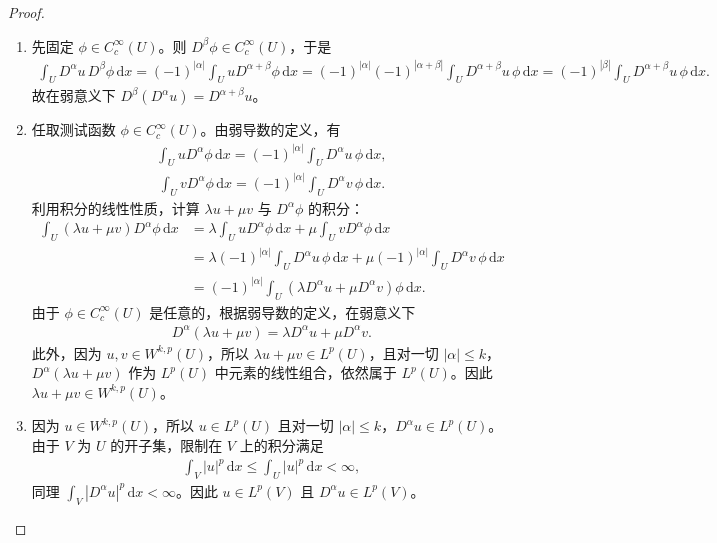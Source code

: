 \documentclass[../../main.tex]{subfiles}
\begin{document}
\begin{proof}
\begin{enumerate}[(1)]
\item 先固定 $\phi\in C^{\infty}_{c}(U)$。则 $D^{\beta}\phi\in C^{\infty}_{c}(U)$，于是
\begin{align*}
\int_{U}D^{\alpha}u\,D^{\beta}\phi\,\mathrm{d}x
=(-1)^{|\alpha|}\int_{U}uD^{\alpha+\beta}\phi\,\mathrm{d}x=(-1)^{|\alpha|}(-1)^{|\alpha+\beta|}\int_{U}D^{\alpha+\beta}u\,\phi\,\mathrm{d}x=(-1)^{|\beta|}\int_{U}D^{\alpha+\beta}u\,\phi\,\mathrm{d}x.
\end{align*}
故在弱意义下 $D^{\beta}(D^{\alpha}u)=D^{\alpha+\beta}u$。

\item 任取测试函数 $\phi\in C^{\infty}_{c}(U)$。由弱导数的定义，有
\begin{align*}
\int_{U}uD^{\alpha}\phi\,\mathrm{d}x=(-1)^{|\alpha|}\int_{U}D^{\alpha}u\,\phi\,\mathrm{d}x,
\end{align*}
\begin{align*}
\int_{U}vD^{\alpha}\phi\,\mathrm{d}x=(-1)^{|\alpha|}\int_{U}D^{\alpha}v\,\phi\,\mathrm{d}x.
\end{align*}
利用积分的线性性质，计算 $\lambda u+\mu v$ 与 $D^{\alpha}\phi$ 的积分：
\begin{align*}
\int_{U}(\lambda u+\mu v)D^{\alpha}\phi\,\mathrm{d}x
&=\lambda\int_{U}uD^{\alpha}\phi\,\mathrm{d}x+\mu\int_{U}vD^{\alpha}\phi\,\mathrm{d}x\\
&=\lambda(-1)^{|\alpha|}\int_{U}D^{\alpha}u\,\phi\,\mathrm{d}x+\mu(-1)^{|\alpha|}\int_{U}D^{\alpha}v\,\phi\,\mathrm{d}x\\
&=(-1)^{|\alpha|}\int_{U}(\lambda D^{\alpha}u+\mu D^{\alpha}v)\phi\,\mathrm{d}x.
\end{align*}
由于 $\phi\in C^{\infty}_{c}(U)$ 是任意的，根据弱导数的定义，在弱意义下
\begin{align*}
D^{\alpha}(\lambda u+\mu v)=\lambda D^{\alpha}u+\mu D^{\alpha}v.
\end{align*}
此外，因为 $u,v\in W^{k,p}(U)$，所以 $\lambda u+\mu v\in L^{p}(U)$，且对一切 $|\alpha|\leqslant k$，$D^{\alpha}(\lambda u+\mu v)$ 作为 $L^{p}(U)$ 中元素的线性组合，依然属于 $L^{p}(U)$。因此 $\lambda u+\mu v\in W^{k,p}(U)$。

\item 因为 $u\in W^{k,p}(U)$，所以 $u\in L^{p}(U)$ 且对一切 $|\alpha|\leqslant k$，$D^{\alpha}u\in L^{p}(U)$。
由于 $V$ 为 $U$ 的开子集，限制在 $V$ 上的积分满足
\begin{align*}
\int_{V}|u|^{p}\,\mathrm{d}x\leqslant\int_{U}|u|^{p}\,\mathrm{d}x<\infty,
\end{align*}
同理 $\int_{V}|D^{\alpha}u|^{p}\,\mathrm{d}x<\infty$。因此 $u\in L^{p}(V)$ 且 $D^{\alpha}u\in L^{p}(V)$。


\end{enumerate}
\end{proof}
\end{document}
